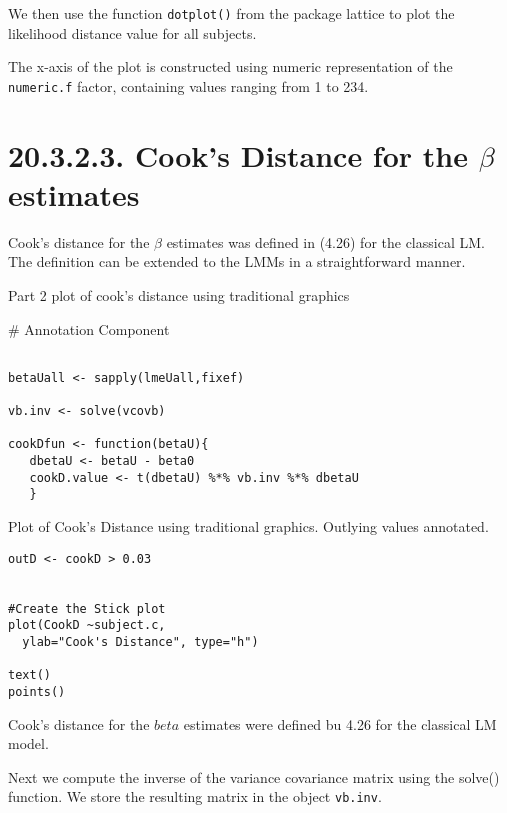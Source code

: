 We then use the function \texttt{dotplot()} from the package lattice to plot the 
likelihood distance value for all subjects.

The x-axis of the plot is constructed using numeric representation of the \texttt{numeric.f} factor, containing values ranging from 1 to 234.
\section{20.3.2.3. Cook's Distance for the $\beta$ estimates}

Cook's distance for the $\beta$ estimates was defined in (4.26) for the classical LM.
The definition can be extended to the LMMs in a straightforward manner.


Part 2 plot of cook's distance using traditional graphics

# Annotation Component

\begin{framed}
\begin{verbatim}

betaUall <- sapply(lmeUall,fixef)

vb.inv <- solve(vcovb)

cookDfun <- function(betaU){
   dbetaU <- betaU - beta0
   cookD.value <- t(dbetaU) %*% vb.inv %*% dbetaU
   }
\end{verbatim}
\end{framed}

Plot of Cook's Distance using traditional graphics. 
Outlying values annotated.

\begin{framed}
\begin{verbatim}
outD <- cookD > 0.03


#Create the Stick plot
plot(CookD ~subject.c, 
  ylab="Cook's Distance", type="h")

text()
points()
\end{verbatim}
\end{framed}

Cook's distance for the $beta$ estimates were defined bu 4.26 for the classical LM model.


Next we compute the inverse of the variance covariance matrix \hat{\beta} using the solve() function.
We store the resulting matrix in the object \texttt{vb.inv}.

